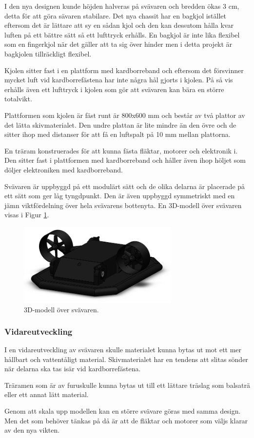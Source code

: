 I den nya designen
kunde höjden halveras på svävaren och bredden ökas 3 cm, detta för att göra
sävaren stabilare. Det nya chassit har en bagkjol istället
eftersom det är lättare att sy en sådan kjol och den kan dessutom hålla kvar
luften på ett bättre sätt så ett lufttryck erhålls. En bagkjol är inte lika
flexibel som en fingerkjol när det gäller att ta sig över hinder men i detta
projekt är bagkjolen tillräckligt flexibel.

Kjolen sitter fast i en plattform med kardborreband och eftersom det försvinner
mycket luft vid kardborrefästena har inte några hål gjorts i kjolen. På så vis
erhålls även ett lufttryck i kjolen som gör att svävaren kan bära en större
totalvikt.

Plattformen som kjolen är fäst runt är 800x600 mm och består av två
plattor av det lätta skivmaterialet. Den undre plattan är lite mindre än den
övre och de sitter ihop med distanser för att få en luftspalt på 10 mm mellan
plattorna.

En träram konstruerades för att kunna fästa fläktar, motorer och elektronik
i. Den sitter fast i plattformen med kardborreband och håller även ihop höljet
som döljer elektroniken med kardborreband.

Svävaren är uppbyggd på ett modulärt sätt och de olika delarna är placerade på
ett sätt som ger låg tyngdpunkt. Den är även uppbyggd symmetriskt med en jämn
viktfördelning över hela svävarens bottenyta. En 3D-modell över svävaren visas i
Figur \ref{fig:CAD_Hover}.

\begin{figure}[htbp!] 
\centering 
\includegraphics[width=8cm]{../includes/figures/CAD_Hovercraft.png} 
\caption{3D-modell över svävaren.} 
\label{fig:CAD_Hover} 
\end{figure}

\subsubsection{Vidareutveckling}
I en vidareutveckling av svävaren skulle materialet kunna bytas ut mot ett mer
hållbart och vattentåligt material. Skivmaterialet har en tendens att slitas
sönder när delarna ska tas isär vid kardborrefästena.

Träramen som är av furuskulle kunna bytas ut till ett lättare träslag som
balsaträ eller ett annat lätt material.

Genom att skala upp modellen kan en större svävare göras med samma design. Men
det som behöver tänkas på då är att de fläktar och motorer som väljs klarar av
den nya vikten.
